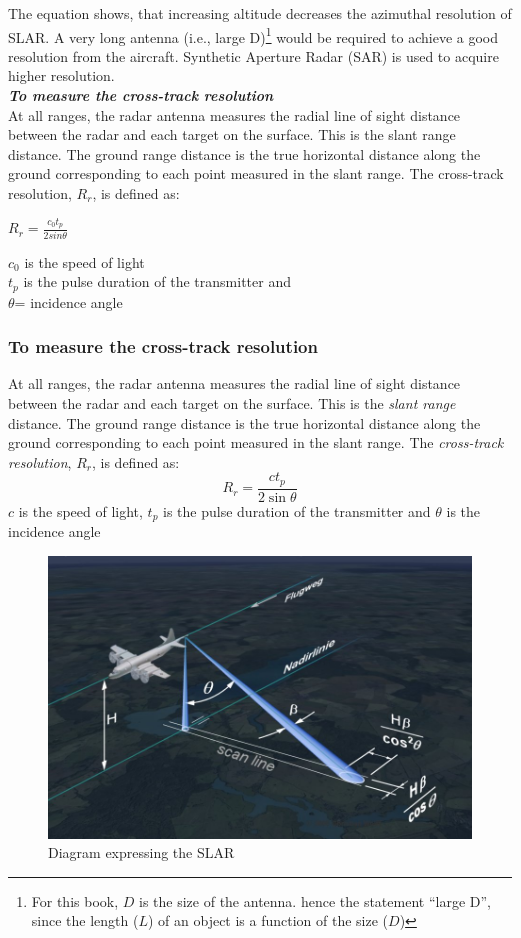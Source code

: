 The equation shows, that increasing altitude decreases the azimuthal resolution of SLAR. A very long antenna (i.e., large D)\footnote{For this book, $D$ is the size of the antenna. hence the statement \textquotedblleft large D\textquotedblright, since the length ($L$) of an object is a function of the size ($D$)} would be required to achieve a good resolution from the aircraft. Synthetic Aperture Radar (SAR) is used to acquire higher resolution.\\

\textit{\textbf{To measure the cross-track resolution }}\\
At all ranges, the radar antenna measures the radial line of sight distance between the radar and each target on the surface. This is the slant range distance. The ground range distance is the true horizontal distance along the ground corresponding to each point measured in the slant range. The cross-track resolution, $R_{r}$, is defined as:  
\begin{center}
$R_{r}=\frac{c_{0} t_{p}}{2 sin\theta}$
\end{center}
$c_{0}$ is the speed of light\\
$t_{p}$ is the pulse duration of the transmitter and\\
$\theta$= incidence angle

\subsubsection*{To measure the cross-track resolution}
At all ranges, the radar antenna measures the radial line of sight distance between the radar and each target on the surface. This is the \textit{slant range} distance. The ground range distance is the true horizontal distance along the ground corresponding to each point measured in the slant range. The \textit{cross-track resolution}, $R_{r}$, is defined as:  
\begin{dmath*}
R_{r}=\frac{ct_{p}}{2\sin\theta}
\end{dmath*}
$c$ is the speed of light, $t_{p}$ is the pulse duration of the transmitter and $\theta$ is the incidence angle
\begin{figure}[h]
\centering
\includegraphics[scale=0.2]{./graphics/SLAR-resolution}
\caption{Diagram expressing the SLAR}
\end{figure}

